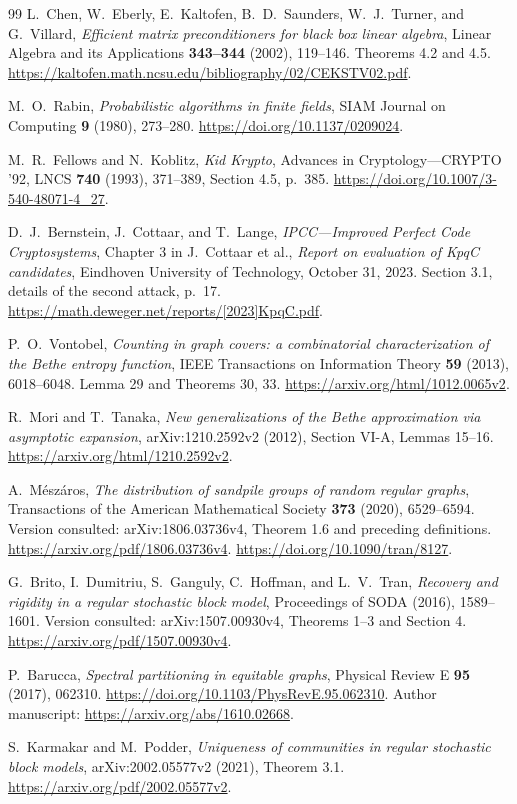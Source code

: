 \documentclass[11pt]{article}
\theoremstyle{definition}
\theoremstyle{remark}
\newcommand{\1}{\mathbf 1}
\begin{document}
\begin{thebibliography}{99}
L.~Chen, W.~Eberly, E.~Kaltofen, B.~D.~Saunders, W.~J.~Turner,
and G.~Villard, \emph{Efficient matrix preconditioners for black box
linear algebra}, Linear Algebra and its Applications \textbf{343--344}
(2002), 119--146. Theorems 4.2 and 4.5.
\url{https://kaltofen.math.ncsu.edu/bibliography/02/CEKSTV02.pdf}.

M.~O.~Rabin, \emph{Probabilistic algorithms in finite fields},
SIAM Journal on Computing \textbf{9} (1980), 273--280.
\url{https://doi.org/10.1137/0209024}.

M.~R.~Fellows and N.~Koblitz, \emph{Kid Krypto},
Advances in Cryptology---CRYPTO '92, LNCS \textbf{740} (1993),
371--389, Section 4.5, p.~385.
\url{https://doi.org/10.1007/3-540-48071-4_27}.

D.~J.~Bernstein, J.~Cottaar, and T.~Lange,
\emph{IPCC---Improved Perfect Code Cryptosystems}, Chapter 3 in
J.~Cottaar et al., \emph{Report on evaluation of KpqC candidates},
Eindhoven University of Technology, October 31, 2023.
Section 3.1, details of the second attack, p.~17.
\url{https://math.deweger.net/reports/[2023]KpqC.pdf}.

P.~O.~Vontobel, \emph{Counting in graph covers: a combinatorial
characterization of the Bethe entropy function},
IEEE Transactions on Information Theory \textbf{59} (2013), 6018--6048.
Lemma 29 and Theorems 30, 33.
\url{https://arxiv.org/html/1012.0065v2}.

R.~Mori and T.~Tanaka, \emph{New generalizations of the Bethe approximation
via asymptotic expansion}, arXiv:1210.2592v2 (2012), Section VI-A,
Lemmas 15--16. \url{https://arxiv.org/html/1210.2592v2}.

A.~M\'esz\'aros, \emph{The distribution of sandpile groups of random
regular graphs}, Transactions of the American Mathematical Society
\textbf{373} (2020), 6529--6594.
Version consulted: arXiv:1806.03736v4, Theorem 1.6 and preceding definitions.
\url{https://arxiv.org/pdf/1806.03736v4}.
\url{https://doi.org/10.1090/tran/8127}.

G.~Brito, I.~Dumitriu, S.~Ganguly, C.~Hoffman, and L.~V.~Tran,
\emph{Recovery and rigidity in a regular stochastic block model},
Proceedings of SODA (2016), 1589--1601.
Version consulted: arXiv:1507.00930v4, Theorems 1--3 and Section 4.
\url{https://arxiv.org/pdf/1507.00930v4}.

P.~Barucca, \emph{Spectral partitioning in equitable graphs},
Physical Review E \textbf{95} (2017), 062310.
\url{https://doi.org/10.1103/PhysRevE.95.062310}.
Author manuscript: \url{https://arxiv.org/abs/1610.02668}.

S.~Karmakar and M.~Podder, \emph{Uniqueness of communities in regular
stochastic block models}, arXiv:2002.05577v2 (2021), Theorem 3.1.
\url{https://arxiv.org/pdf/2002.05577v2}.

\end{thebibliography}
\end{document}
